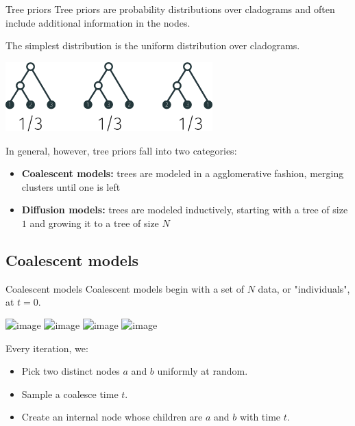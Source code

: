 \documentclass[10pt, compress]{beamer}
\begin{document}
\begin{frame}{Tree priors}
  Tree priors are probability distributions over cladograms
  and often include additional information
  in the nodes.

  \pause

  The simplest distribution is the uniform distribution over
  cladograms.

  \pause

  \begin{center}
    \includegraphics[width=0.6\textwidth]{img/uniform-distribution}
  \end{center}

  \pause
  In general, however, tree priors fall into two categories:
  \begin{itemize}
    \item \textbf{Coalescent models:} trees are modeled in a 
      agglomerative fashion, merging clusters until 
      one is left
    \item \textbf{Diffusion models:} trees are modeled inductively,
      starting with a tree of size $1$ and growing it to
      a tree of size $N$
  \end{itemize}
\end{frame}

\subsection{Coalescent models}

\begin{frame}{Coalescent models}
  Coalescent models begin with a set of $N$
  data, or "individuals", at $t = 0$.

  \begin{center}
    \includegraphics<1>[width=0.5\textwidth]{img/coalescent-1}
    \includegraphics<2>[width=0.5\textwidth]{img/coalescent-2}
    \includegraphics<3>[width=0.5\textwidth]{img/coalescent-3}
    \includegraphics<4>[width=0.5\textwidth]{img/coalescent-4}
  \end{center}

  \pause

  Every iteration, we:
  \begin{itemize}
    \item Pick two distinct nodes $a$ and $b$ uniformly at random.
    \item Sample a coalesce time $t$.
    \item Create an internal node whose children are $a$ and $b$
      with time $t$.
  \end{itemize}
\end{frame}
\end{document}
